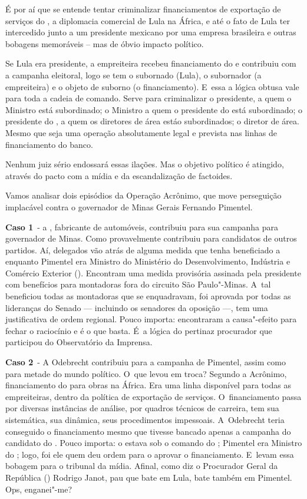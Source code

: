 É por aí que se entende tentar criminalizar financiamentos de exportação
de serviços do , a diplomacia comercial de Lula na África, e até o
fato de Lula ter intercedido junto a um presidente mexicano por uma
empresa brasileira e outras bobagens memoráveis -- mas de óbvio impacto
político.

Se Lula era presidente, a empreiteira recebeu financiamento do  e
contribuiu com a campanha eleitoral, logo se tem o subornado (Lula), o
subornador (a empreiteira) e o objeto de suborno (o financiamento). E~essa a lógica obtusa vale para toda a cadeia de comando. Serve para
criminalizar o presidente, a quem o Ministro está subordinado; o
Ministro a quem o presidente do  está subordinado; o presidente do
, a quem os diretores de área estáo subordinados; o diretor de
área. Mesmo que seja uma operação absolutamente legal e prevista nas
linhas de financiamento do banco.

Nenhum juiz sério endossará essas ilações. Mas o objetivo político é
atingido, através do pacto com a mídia e da escandalização de factoides.

Vamos analisar dois episódios da Operação Acrônimo, que move perseguição
implacável contra o governador de Minas Gerais Fernando Pimentel.

\textbf{Caso 1}~- a , fabricante de automóveis, contribuiu para sua
campanha para governador de Minas. Como provavelmente contribuiu para
candidatos de outros partidos. Aí, delegados vão atrás de alguma medida
que tenha beneficiado a  enquanto Pimentel era Ministro do
Ministério do Desenvolvimento, Indústria e Comércio Exterior ().
Encontram uma medida provisória assinada pela presidente com benefícios
para montadoras fora do circuito São Paulo"-Minas. A~tal  beneficiou
todas as montadoras que se enquadravam, foi aprovada por todas as
lideranças do Senado --- incluindo os senadores da oposição \mbox{---,} tem uma
justificativa de ordem regional. Pouco importa: encontraram a
causa"-efeito para fechar o raciocínio e é o que basta. É~a lógica do
pertinaz procurador que participou do Observatório da Imprensa.

\textbf{Caso 2}~- A Odebrecht contribuiu para a campanha de Pimentel,
assim como para metade do mundo político. O~que levou em troca? Segundo
a Acrônimo, financiamento do  para obras na África. Era uma linha
disponível para todas as empreiteiras, dentro da política de exportação
de serviços. O~financiamento passa por diversas instâncias de análise,
por quadros técnicos de carreira, tem sua sistemática, sua dinâmica,
seus procedimentos impessoais. A~Odebrecht teria conseguido o
financiamento mesmo que tivesse bancado apenas a campanha do candidato
do . Pouco importa: o  estava sob o comando do ; Pimentel
era Ministro do ; logo, foi ele quem deu ordem para o  aprovar
o financiamento. E~levam essa bobagem para o tribunal da mídia. Afinal,
como diz o Procurador Geral da República () Rodrigo Janot, pau que
bate em Lula, bate também em Pimentel. Ops, enganei"-me?

